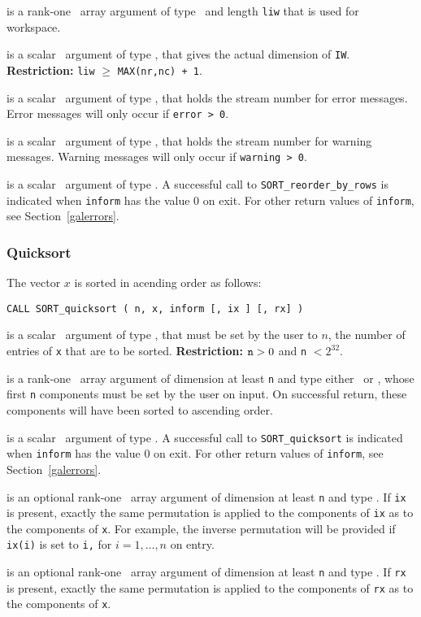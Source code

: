 \documentclass{galahad}
\newcommand{\packagename}{SORT}
\begin{document}
\begin{description}
  is a rank-one \intentout\ array argument of type
\integer\ and length {\tt liw} that is used for workspace.

  is a scalar \intentin\ argument of type
\integer, that gives the actual dimension of {\tt IW}.
{\bf Restriction:} {\tt liw} $\geq$ {\tt MAX(nr,nc) + 1}.

 is a scalar \intentin\ argument of type
\integer, that holds the stream number for error messages.
Error messages will only occur if {\tt error > 0}.

 is a scalar \intentin\ argument of type
\integer, that holds the stream number for warning messages.
Warning messages will only occur if {\tt warning > 0}.

 is a scalar \intentout\ argument of type \integer.
A successful call to {\tt \packagename\_reorder\_by\_rows}
is indicated when {\tt inform} has the value 0 on exit.
For other return values of {\tt inform}, see Section~\ref{galerrors}.

\end{description}

\subsubsection{Quicksort}

The vector $x$ is sorted in acending order as follows:
\vspace*{1mm}

\hspace{8mm}
{\tt CALL \packagename\_quicksort ( n, x, inform [, ix ] [, rx] )}

\begin{description}
 is a scalar \intentin\ argument of type
\integer, that must be set by the user to $n$, the
number of entries of {\tt x} that are to be sorted.
{\bf Restriction:} ${\tt n} > 0$  and {\tt n} $< 2^{32}$.

 is a rank-one \intentinout\ array argument of
dimension at least {\tt n} and type either
\integer\ or \realdp, whose first {\tt n} components must be set by
the user on input. On successful return, these components will have
been sorted to ascending order.

 is a scalar \intentout\ argument of type \integer.
A successful call to {\tt \packagename\_quicksort}
is indicated when {\tt inform} has the value 0 on exit.
For other return values of {\tt inform}, see Section~\ref{galerrors}.

 is an optional rank-one \intentinout\ array argument of
dimension at least {\tt n} and type \integer.
If {\tt ix} is present, exactly the same permutation is applied to the
components of {\tt ix} as to the components of {\tt x}.
For example, the inverse permutation will be provided if {\tt ix(i)} is set to
{\tt i,} for $i = 1, \ldots, n$ on entry.

 is an optional rank-one \intentinout\ array argument of
dimension at least {\tt n} and type \realdp.
If {\tt rx} is present, exactly the same permutation is applied to the
components of {\tt rx} as to the components of {\tt x}.

\end{description}
\end{document}
